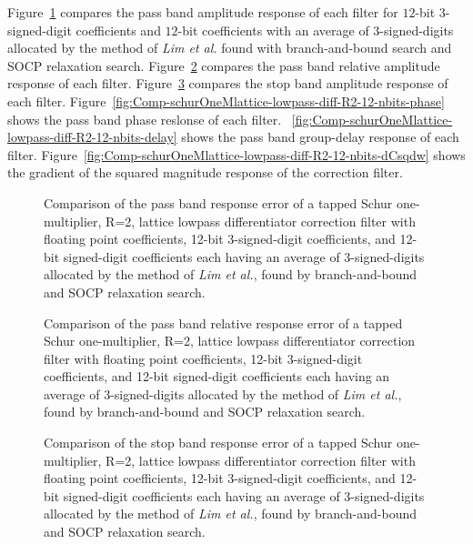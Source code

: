 \documentclass[a4paper,twoside,10pt,english]{article}
\newcommand{\DesignOfSchurLatticeFiltersPdfScale}{1}
\begin{document}
Figure~\ref{fig:Comp-schurOneMlattice-lowpass-diff-R2-12-nbits-pass}
compares the pass band amplitude response of each filter for
$12$-bit $3$-signed-digit coefficients and $12$-bit coefficients with an average
of $3$-signed-digits allocated by the method of \emph{Lim et al.} found with
branch-and-bound search and SOCP relaxation search.
Figure~\ref{fig:Comp-schurOneMlattice-lowpass-diff-R2-12-nbits-relative-pass}
compares the pass band relative amplitude response of each filter.
Figure~\ref{fig:Comp-schurOneMlattice-lowpass-diff-R2-12-nbits-stop}
compares the stop band amplitude response of each filter.
Figure~\ref{fig:Comp-schurOneMlattice-lowpass-diff-R2-12-nbits-phase} shows
the pass band phase reslonse of each filter.
~\ref{fig:Comp-schurOneMlattice-lowpass-diff-R2-12-nbits-delay} shows the
pass band group-delay response of each filter.
Figure~\ref{fig:Comp-schurOneMlattice-lowpass-diff-R2-12-nbits-dCsqdw} shows
the gradient of the squared magnitude response of the correction filter.

\begin{figure}
\centering
\scalebox{\DesignOfSchurLatticeFiltersPdfScale}{}
\caption{Comparison of the pass band response error of
  a tapped Schur one-multiplier, R=2, lattice lowpass differentiator correction
  filter with floating point coefficients, 12-bit 3-signed-digit coefficients,
  and 12-bit signed-digit coefficients each having an average of 3-signed-digits
  allocated by the method of \emph{Lim et al.}, found by branch-and-bound and
  SOCP relaxation search.}
\label{fig:Comp-schurOneMlattice-lowpass-diff-R2-12-nbits-pass}
\end{figure}

\begin{figure}
\centering
\scalebox{\DesignOfSchurLatticeFiltersPdfScale}{}
\caption{Comparison of the pass band relative response error of
  a tapped Schur one-multiplier, R=2, lattice lowpass differentiator correction
  filter with floating point coefficients, 12-bit 3-signed-digit coefficients,
  and 12-bit signed-digit coefficients each having an average of 3-signed-digits
  allocated by the method of \emph{Lim et al.}, found by branch-and-bound and
  SOCP relaxation search.}
\label{fig:Comp-schurOneMlattice-lowpass-diff-R2-12-nbits-relative-pass}
\end{figure}

\begin{figure}
\centering
\scalebox{\DesignOfSchurLatticeFiltersPdfScale}{}
\caption{Comparison of the stop band response error of
  a tapped Schur one-multiplier, R=2, lattice lowpass differentiator correction
  filter with floating point coefficients, 12-bit 3-signed-digit coefficients,
  and 12-bit signed-digit coefficients each having an average of 3-signed-digits
  allocated by the method of \emph{Lim et al.}, found by branch-and-bound and
  SOCP relaxation search.}
\label{fig:Comp-schurOneMlattice-lowpass-diff-R2-12-nbits-stop}
\end{figure}
\end{document}
